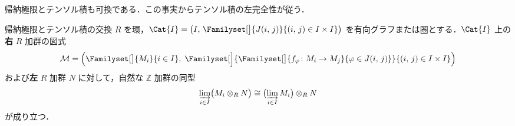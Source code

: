 \documentclass[algtopo_main]{subfiles}
\begin{document}
帰納極限とテンソル積も可換である．この事実からテンソル積の左完全性が従う．

\begin{myprop}[label=prop:comm-lim2tensor]{帰納極限とテンソル積の交換}
	$R$ を環，$\Cat{I} = \bigl( I,\, \Familyset[\big]{J(i,\, j)}{(i,\, j) \in I\times I} \bigr) $ を有向グラフまたは圏とする．$\Cat{I}$ 上の\textbf{右} $R$ 加群の図式
	\begin{align}
		\mathcal{M} = \Bigl( \Familyset[\big]{M_i}{i \in I},\; \Familyset[\Big]{\Familyset[\big]{f_\varphi \colon M_i \to M_j}{\varphi \in J(i,\, j)}}{(i,\, j) \in I \times I} \Bigr)
	\end{align}
	および\textbf{左} $R$ 加群 $N$ に対して，自然な $\mathbb{Z}$ 加群の同型
	\begin{align}
		\varinjlim_{i \in I} \bigl( M_i \otimes_R N \bigr) \cong \bigl( \varinjlim_{i \in I} M_i \bigr) \otimes_R N
	\end{align}
	が成り立つ．
\end{myprop}
\end{document}
